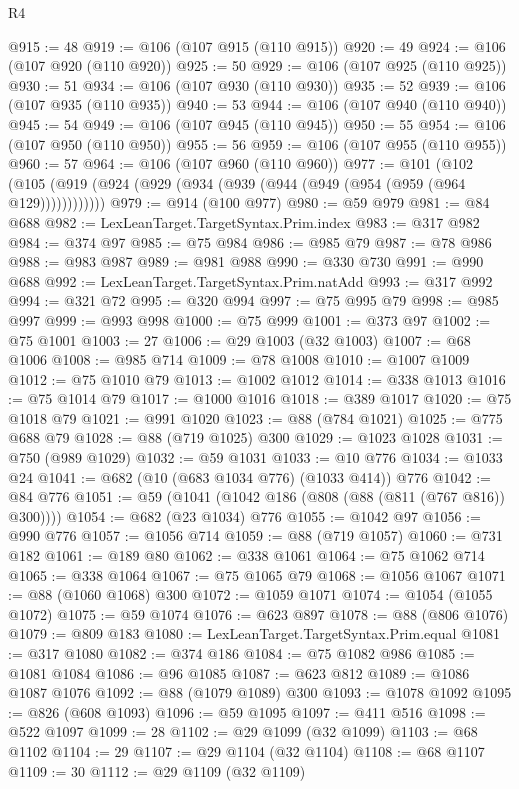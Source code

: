 \begin{lexlean}{R4}
\begin{coremodule}
{{{{{{{{{{{{{{{{{{{{{{{{{{{{{{{{{{{{{{{{{{{{{{{{{{{{{{{{{{{{{{{{{{{{{{{{{{{{{{{{{{{{{{{{{{{{@915 := 48
@919 := @106 (@107 @915 (@110 @915))
@920 := 49
@924 := @106 (@107 @920 (@110 @920))
@925 := 50
@929 := @106 (@107 @925 (@110 @925))
@930 := 51
@934 := @106 (@107 @930 (@110 @930))
@935 := 52
@939 := @106 (@107 @935 (@110 @935))
@940 := 53
@944 := @106 (@107 @940 (@110 @940))
@945 := 54
@949 := @106 (@107 @945 (@110 @945))
@950 := 55
@954 := @106 (@107 @950 (@110 @950))
@955 := 56
@959 := @106 (@107 @955 (@110 @955))
@960 := 57
@964 := @106 (@107 @960 (@110 @960))
@977 := @101
    (@102 (@105 (@919 (@924 (@929 (@934 (@939 (@944 (@949 (@954 (@959 (@964 @129))))))))))))
@979 := @914 (@100 @977)
@980 := @59 @979
@981 := @84 @688
@982 := LexLeanTarget.TargetSyntax.Prim.index
@983 := @317 @982
@984 := @374 @97
@985 := @75 @984
@986 := @985 @79
@987 := @78 @986
@988 := @983 @987
@989 := @981 @988
@990 := @330 @730
@991 := @990 @688
@992 := LexLeanTarget.TargetSyntax.Prim.natAdd
@993 := @317 @992
@994 := @321 @72
@995 := @320 @994
@997 := @75 @995 @79
@998 := @985 @997
@999 := @993 @998
@1000 := @75 @999
@1001 := @373 @97
@1002 := @75 @1001
@1003 := 27
@1006 := @29 @1003 (@32 @1003)
@1007 := @68 @1006
@1008 := @985 @714
@1009 := @78 @1008
@1010 := @1007 @1009
@1012 := @75 @1010 @79
@1013 := @1002 @1012
@1014 := @338 @1013
@1016 := @75 @1014 @79
@1017 := @1000 @1016
@1018 := @389 @1017
@1020 := @75 @1018 @79
@1021 := @991 @1020
@1023 := @88 (@784 @1021)
@1025 := @775 @688 @79
@1028 := @88 (@719 @1025) @300
@1029 := @1023 @1028
@1031 := @750 (@989 @1029)
@1032 := @59 @1031
@1033 := @10 @776
@1034 := @1033 @24
@1041 := @682 (@10 (@683 @1034 @776) (@1033 @414)) @776
@1042 := @84 @776
@1051 := @59 (@1041 (@1042 @186 (@808 (@88 (@811 (@767 @816)) @300))))
@1054 := @682 (@23 @1034) @776
@1055 := @1042 @97
@1056 := @990 @776
@1057 := @1056 @714
@1059 := @88 (@719 @1057)
@1060 := @731 @182
@1061 := @189 @80
@1062 := @338 @1061
@1064 := @75 @1062 @714
@1065 := @338 @1064
@1067 := @75 @1065 @79
@1068 := @1056 @1067
@1071 := @88 (@1060 @1068) @300
@1072 := @1059 @1071
@1074 := @1054 (@1055 @1072)
@1075 := @59 @1074
@1076 := @623 @897
@1078 := @88 (@806 @1076)
@1079 := @809 @183
@1080 := LexLeanTarget.TargetSyntax.Prim.equal
@1081 := @317 @1080
@1082 := @374 @186
@1084 := @75 @1082 @986
@1085 := @1081 @1084
@1086 := @96 @1085
@1087 := @623 @812
@1089 := @1086 @1087 @1076
@1092 := @88 (@1079 @1089) @300
@1093 := @1078 @1092
@1095 := @826 (@608 @1093)
@1096 := @59 @1095
@1097 := @411 @516
@1098 := @522 @1097
@1099 := 28
@1102 := @29 @1099 (@32 @1099)
@1103 := @68 @1102
@1104 := 29
@1107 := @29 @1104 (@32 @1104)
@1108 := @68 @1107
@1109 := 30
@1112 := @29 @1109 (@32 @1109)
}}}}}}}}}}}}}}}}}}}}}}}}}}}}}}}}}}}}}}}}}}}}}}}}}}}}}}}}}}}}}}}}}}}}}}}}}}}}}}}}}}}}}}}}}}}}
\end{coremodule}
\end{lexlean}
